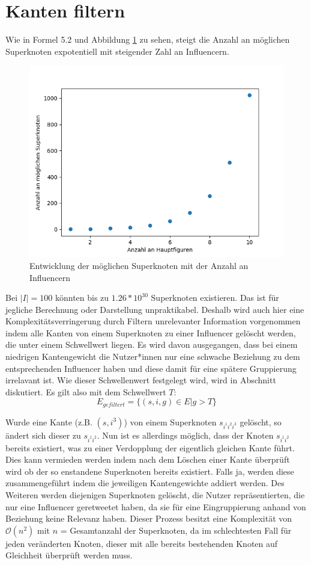 \section{Kanten filtern}
\label{sec:kanten-filtern}
Wie in Formel 5.2 und Abbildung \ref{fig:superknotenentwicklung} zu sehen, steigt die Anzahl an möglichen Superknoten expotentiell mit steigender Zahl an Influencern.
\begin{figure}[h]
	\centering
	\includegraphics[width=0.7\linewidth]{images/Superknotenentwicklung}
	\caption[]{Entwicklung der möglichen Superknoten mit der Anzahl an Influencern}
	\label{fig:superknotenentwicklung}
\end{figure}
Bei $|I| = 100$ könnten bis zu $1.26*10^{30}$ Superknoten existieren. Das ist für jegliche Berechnung oder Darstellung unpraktikabel.
Deshalb wird auch hier eine Komplexitätsverringerung durch Filtern unrelevanter Information vorgenommen indem alle Kanten von einem Superknoten zu einer Influencer gelöscht werden, die unter einem Schwellwert liegen. 
Es wird davon ausgegangen, dass  bei einem niedrigen Kantengewicht die Nutzer*innen nur eine schwache Beziehung zu dem entsprechenden Influencer haben und diese damit für eine spätere Gruppierung irrelavant ist. 
Wie dieser Schwellenwert festgelegt wird, wird in Abschnitt diskutiert. 
Es gilt also mit dem Schwellwert $T$: \begin{equation}
	E_{gefiltert} = \{(s,i,g)\in E|g>T\}
\end{equation}

Wurde eine Kante (z.B. $(s,i^3)$) von einem Superknoten $s_{i^1i^2i^3}$ gelöscht, so ändert sich dieser zu $s_{i^1i^2}$. Nun ist es allerdings möglich, dass der Knoten $s_{i^1i^2}$ bereits existiert, was zu einer Verdopplung der eigentlich gleichen Kante führt. Dies kann vermieden werden indem nach dem Löschen einer Kante überprüft wird ob der so enstandene Superknoten bereits existiert. Falls ja, werden diese zusammengeführt indem die jeweiligen Kantengewichte addiert werden.
Des Weiteren werden diejenigen Superknoten gelöscht, die Nutzer repräsentierten, die nur eine Influencer \gls{geretweetet} haben, da sie für eine Eingruppierung anhand von Beziehung keine Relevanz haben.
Dieser Prozess besitzt eine Komplexität von $\mathcal{O}(n^2)$ mit $n$ = Gesamtanzahl der Superknoten, da im schlechtesten Fall für jeden veränderten Knoten, dieser mit alle bereits bestehenden Knoten auf Gleichheit überprüft werden muss.
